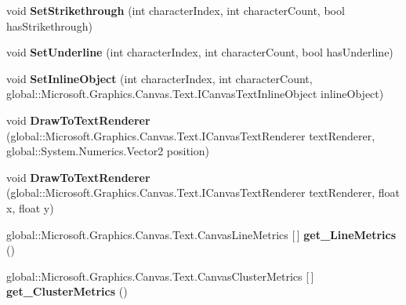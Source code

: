 \begin{DoxyCompactItemize}
void {\bfseries Set\+Strikethrough} (int character\+Index, int character\+Count, bool has\+Strikethrough)
\item 
\mbox{\label{class_microsoft_1_1_graphics_1_1_canvas_1_1_text_1_1_canvas_text_layout_a5c9ca1a5dab01179d0a389e3298b1f09}} 
void {\bfseries Set\+Underline} (int character\+Index, int character\+Count, bool has\+Underline)
\item 
\mbox{\label{class_microsoft_1_1_graphics_1_1_canvas_1_1_text_1_1_canvas_text_layout_a4d0d027830a031c0d15c1e89b0f84142}} 
void {\bfseries Set\+Inline\+Object} (int character\+Index, int character\+Count, global\+::\+Microsoft.\+Graphics.\+Canvas.\+Text.\+I\+Canvas\+Text\+Inline\+Object inline\+Object)
\item 
\mbox{\label{class_microsoft_1_1_graphics_1_1_canvas_1_1_text_1_1_canvas_text_layout_adcedc6eac15894cd67db704b047bb206}} 
void {\bfseries Draw\+To\+Text\+Renderer} (global\+::\+Microsoft.\+Graphics.\+Canvas.\+Text.\+I\+Canvas\+Text\+Renderer text\+Renderer, global\+::\+System.\+Numerics.\+Vector2 position)
\item 
\mbox{\label{class_microsoft_1_1_graphics_1_1_canvas_1_1_text_1_1_canvas_text_layout_ae94965b9797ceb30515e3352cba05fdd}} 
void {\bfseries Draw\+To\+Text\+Renderer} (global\+::\+Microsoft.\+Graphics.\+Canvas.\+Text.\+I\+Canvas\+Text\+Renderer text\+Renderer, float x, float y)
\item 
\mbox{\label{class_microsoft_1_1_graphics_1_1_canvas_1_1_text_1_1_canvas_text_layout_aeb404118734ea91e7bee88ebc313cec1}} 
global\+::\+Microsoft.\+Graphics.\+Canvas.\+Text.\+Canvas\+Line\+Metrics \mbox{[}$\,$\mbox{]} {\bfseries get\+\_\+\+Line\+Metrics} ()
\item 
\mbox{\label{class_microsoft_1_1_graphics_1_1_canvas_1_1_text_1_1_canvas_text_layout_a0d448b366382895fac2e94fc9b2358dd}} 
global\+::\+Microsoft.\+Graphics.\+Canvas.\+Text.\+Canvas\+Cluster\+Metrics \mbox{[}$\,$\mbox{]} {\bfseries get\+\_\+\+Cluster\+Metrics} ()

\end{DoxyCompactItemize}
